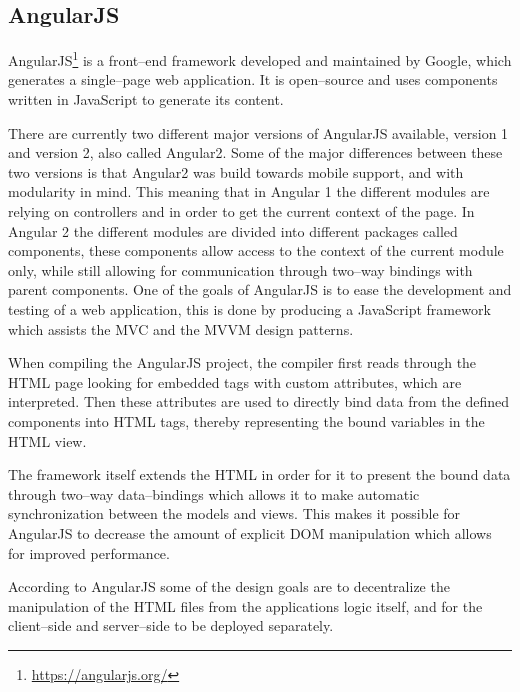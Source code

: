 \subsection{AngularJS}\label{ssec:angular}
AngularJS\footnote{\url{https://angularjs.org/}} is a front--end framework developed and maintained by Google, which generates a single--page web application.
It is open--source and uses components written in JavaScript to generate its content.

\bigskip
There are currently two different major versions of AngularJS available, version 1 and version 2, also called Angular2\cite{angular_1_2}.
Some of the major differences between these two versions is that Angular2 was build towards mobile support, and with modularity in mind.
This meaning that in Angular 1 the different modules are relying on controllers and  in order to get the current context of the page.
In Angular 2 the different modules are divided into different packages called components, these components allow access to the context of the current module only, while still allowing for communication through two--way bindings with parent components.
One of the goals of AngularJS is to ease the development and testing of a web application, this is done by producing a JavaScript framework which assists the MVC and the MVVM design patterns.

\bigskip
When compiling the AngularJS project, the compiler first reads through the HTML page looking for embedded tags with custom attributes, which are interpreted.
Then these attributes are used to directly bind data from the defined components into HTML tags, thereby representing the bound variables in the HTML view.

The framework itself extends the HTML in order for it to present the bound data through two--way data--bindings which allows it to make automatic synchronization between the models and views.
This makes it possible for AngularJS to decrease the amount of explicit \ac{DOM} manipulation which allows for improved performance.

According to AngularJS some of the design goals are to decentralize the manipulation of the HTML files from the applications logic itself, and for the client--side and server--side to be deployed separately.

